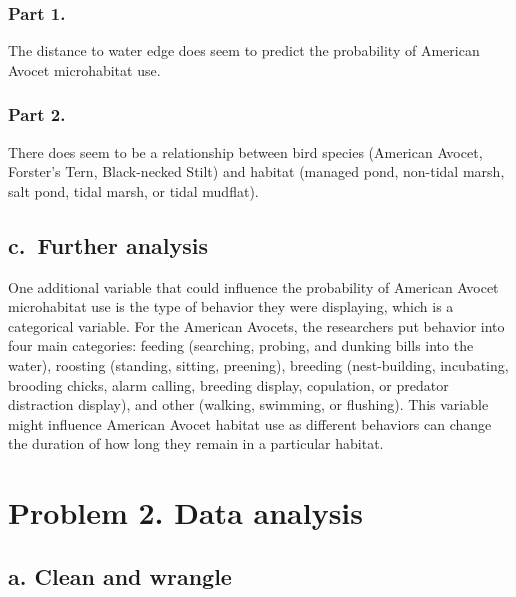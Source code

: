\documentclass[
  letterpaper,
  DIV=11,
  numbers=noendperiod]{scrartcl}
\begin{document}
\subsubsection{Part 1.}\label{part-1.}

The distance to water edge does seem to predict the probability of
American Avocet microhabitat use.

\subsubsection{Part 2.}\label{part-2.}

There does seem to be a relationship between bird species (American
Avocet, Forster's Tern, Black-necked Stilt) and habitat (managed pond,
non-tidal marsh, salt pond, tidal marsh, or tidal mudflat).

\subsection{c.~Further analysis}\label{c.-further-analysis}

One additional variable that could influence the probability of American
Avocet microhabitat use is the type of behavior they were displaying,
which is a categorical variable. For the American Avocets, the
researchers put behavior into four main categories: feeding (searching,
probing, and dunking bills into the water), roosting (standing, sitting,
preening), breeding (nest-building, incubating, brooding chicks, alarm
calling, breeding display, copulation, or predator distraction display),
and other (walking, swimming, or flushing). This variable might
influence American Avocet habitat use as different behaviors can change
the duration of how long they remain in a particular habitat.

\section{Problem 2. Data analysis}\label{problem-2.-data-analysis}

\subsection{a. Clean and wrangle}\label{a.-clean-and-wrangle}
\end{document}
